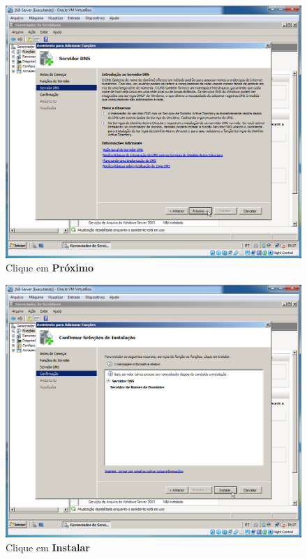 \documentclass[10pt]{article}
\begin{document}
\begin{figure}[H]
    \centering
    \caption{Clique em \textbf{Próximo}}
    \label{fig:DNS007}
    \includegraphics[width=\linewidth]{images/windows_server/dns/007.png}
\end{figure}
\begin{figure}[H]
    \centering
    \caption{Clique em \textbf{Instalar}}
    \label{fig:DNS008}
    \includegraphics[width=\linewidth]{images/windows_server/dns/008.png}
\end{figure}
\end{document}
